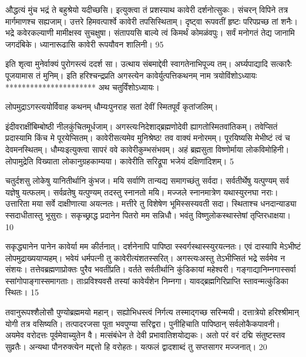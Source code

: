 औद्धत्यं मुंच भद्रं ते बहुश्रेयो यदीच्छसि।
इत्युक्त्वा तं प्रशस्याथ कावेरी दर्शनोत्सुकः।
संचरन् विपिने तत्र मार्गमाणश्च सह्यजाम्।
उत्तरे हिमवत्पार्श्वे कावेरी तपसिस्थिताम्।
दृष्ट्वा रूपवतीं हृष्टः परिपप्रच्छ तां शनैः।
भद्रे कवेरकल्याणी मामीक्षस्व सुचक्षुषा।
संतापयसि बाल्ये त्वं किमर्थं कोमळंवपुः।
सर्वं मनोगतं तेद्य जानामि जगदंबिके।
ध्यानारूढासि कावेरी रूपयौवन शालिनी।
95

इति शृत्वा मुनेर्वाक्यं पुरोगस्त्यं ददर्श सा।
उत्थाय संबमाद्देवी स्वागतेनाभिपूज्य तम्।
अर्घ्यपाद्यादि सत्कारैः पूजयामास तं मुनिम्।
इति हरिश्चन्द्रप्रति अगस्त्येन कावेर्युत्पत्तिकथनम्
नाम त्रयोविंशोऽध्यायः
**********************
अथ चतुर्विंशोऽध्यायः।

लोपमुद्राऽगस्त्ययोर्विवाह कथनम् धौम्यःपुनराह सतां देवीं स्मितपूर्वं कृतांजलिम्।

इंदीवराक्षींबिम्बोष्ठी नीलकुंचितमूर्धजाम्।
अगस्त्यःनिदेशाद्ब्रह्मणोदेवी ह्यागतोस्मितवांतिकम्।
तवेप्सितं प्रदास्यामि किंच मे पूरयेप्सितम्।
कावेरीसत्यमेव मुनिश्रेष्ठ! तव वाक्यं मनोरमम्।
पूरयिष्यसि मेभीष्टं त्वं च देवमनस्थितम्।
धौम्यःइत्युक्त्वा सापरं ववे कावेरीकुम्भसंभवम्।
अहं ब्रह्मसुता विष्णोर्माया लोकविमोहिनी।
लोपामुद्रेति विख्याता लोकानुग्रहकाम्यया।
कावेरीति सरिद्रूपा भजेयं दक्षिणांदिशम्।
5

चतुर्दशसु लोकेषु यानितीर्थानि कुंभज।
मयि सर्वाणि तान्यद्य समागच्छंतु सर्वदा।
सर्वतीर्थेषु यत्पुण्यम् सर्व यज्ञेषु यत्फलम्।
सर्वव्रतेषु यत्पुण्यम् तदस्तु स्नानतो मयि।
मज्जले स्नानमात्रेण यथास्युरनघा नराः।
उत्तारिता मया सर्वे दाक्षीणात्या अयत्नतः।
मत्तीरे तु विशेषेण भूमिस्सस्यवती सदा।
स्थिताश्च धनदान्याड्या स्सदाधीतास्तु भूसुराः।
सकृच्छ्राद्ध प्रदानेन पितरो मम सन्निधौ।
भवंतु विष्णुलोकस्थास्तेषां तृप्तिरधाक्षया।
10


सकृद्ध्यानेन पानेन कावेर्या मम कीर्तनात्।
दर्शनेनापि पापिष्ठा स्स्वर्गस्थास्स्युरयत्नतः।
एवं दास्यापि मेऽभीष्टं लोपमुद्राख्ययाप्यहम्।
भवेयं धर्मपत्नी तु कावेरीत्यंशतस्सरित्।
अगस्त्यःअस्तु तेऽभीप्सितं भद्रे सर्वमेव न संशयः।
तत्तेवब्रह्मणाप्रोक्तः पुरैव भवतींप्रति।
वर्तते सर्वतीर्थानि कुंडिकायां महेश्वरी।
गङ्गाद्यानिम्नगास्सर्वा स्सांगोपाङ्गास्समागताः।
ताःप्रविश्यवसै तस्यां कावेर्यंशेन निम्नगा।
यावद्ब्रह्मगिरिप्राप्ति स्तावन्मत्कुंडिका स्थितः।
15

तवानुरूपश्शैलोसौ पुण्योब्रह्ममयो महान्।
सह्योभिधस्त्वं निर्गत्य तस्माद्गच्छ सरिन्मयी।
दत्तात्रेयो हरिश्श्रीमान् योगी तत्र वसिष्यति।
तत्पादरजसा पूता भवपुण्या सरिद्वरा।
पुनीहिचाति पापिष्ठान् सर्वलोकैकपावनी।
अयमेव वरोदत्तः पूर्वमेवाच्युतेन वै।
मत्संबंधेन ते देवी प्रभावातिशयोद्यकः।
अतो परं वरं दद्मि संतुष्टस्तव सुव्रतैः।
अन्यथा पौनरुक्त्येन मद्दत्तो हि वरोहतः।
यत्फलं द्वादशाब्दं तु सप्तसागर मज्जनात्।
20

